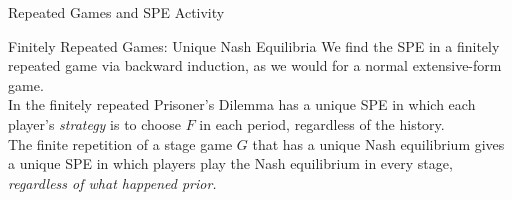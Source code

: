 \documentclass[10pt]{extarticle}
\begin{document}
  \begin{problem}{Repeated Games and SPE Activity}
    \begin{tcbraster}[raster columns = 2,colframe = black!75!white,colback=white]
    \end{tcbraster}
  \end{problem}
  \begin{problem}{Finitely Repeated Games: Unique Nash Equilibria}
    We find the SPE in a finitely repeated game via backward induction, as we would for a normal extensive-form game.\\

    In the finitely repeated Prisoner's Dilemma has a unique SPE in which each player's \textit{strategy} is to choose $F$ in each period, regardless of the history.\\

    The finite repetition of a stage game $G$ that has a unique Nash equilibrium gives a unique SPE in which players play the Nash equilibrium in every stage, \textit{regardless of what happened prior.}
  \end{problem}
\end{document}
